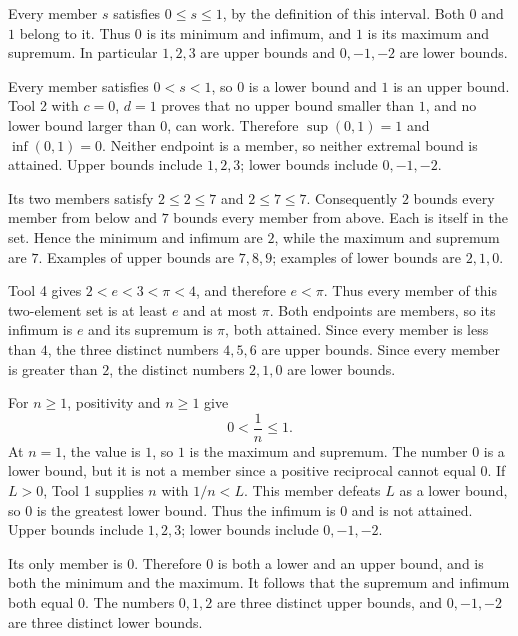 \label{bounds:a}
Every member $s$ satisfies $0\leq s\leq1$, by the definition of this
interval. Both $0$ and $1$ belong to it. Thus $0$ is its minimum and
infimum, and $1$ is its maximum and supremum. In particular $1,2,3$
are upper bounds and $0,-1,-2$ are lower bounds.

\label{bounds:b}
Every member satisfies $0<s<1$, so $0$ is a lower bound and $1$ is
an upper bound. Tool 2 with $c=0$, $d=1$ proves that no upper bound
smaller than $1$, and no lower bound larger than $0$, can work.
Therefore $\sup(0,1)=1$ and $\inf(0,1)=0$. Neither endpoint is a
member, so neither extremal bound is attained. Upper bounds include
$1,2,3$; lower bounds include $0,-1,-2$.

\label{bounds:c}
Its two members satisfy $2\leq2\leq7$ and $2\leq7\leq7$.
Consequently $2$ bounds every member from below and $7$ bounds every
member from above. Each is itself in the set. Hence the minimum and
infimum are $2$, while the maximum and supremum are $7$.
Examples of upper bounds are $7,8,9$; examples of lower bounds are
$2,1,0$.

\label{bounds:d}
Tool 4 gives $2<e<3<\pi<4$, and therefore $e<\pi$.
Thus every member of this two-element set is at least $e$ and at
most $\pi$. Both endpoints are members, so its infimum is $e$ and
its supremum is $\pi$, both attained. Since every member is less
than $4$, the three distinct numbers $4,5,6$ are upper bounds.
Since every member is greater than $2$, the distinct numbers $2,1,0$
are lower bounds.

\label{bounds:e}
For $n\geq1$, positivity and $n\geq1$ give
\[
 0<\frac1n\leq1.
\]
At $n=1$, the value is $1$, so $1$ is the maximum and supremum.
The number $0$ is a lower bound, but it is not a member since a
positive reciprocal cannot equal $0$. If $L>0$, Tool 1 supplies
$n$ with $1/n<L$. This member defeats $L$ as a lower bound, so
$0$ is the greatest lower bound. Thus the infimum is $0$ and is
not attained. Upper bounds include $1,2,3$; lower bounds include
$0,-1,-2$.

\label{bounds:f}
Its only member is $0$. Therefore $0$ is both a lower and an upper
bound, and is both the minimum and the maximum. It follows that
the supremum and infimum both equal $0$. The numbers $0,1,2$ are
three distinct upper bounds, and $0,-1,-2$ are three distinct lower
bounds.

